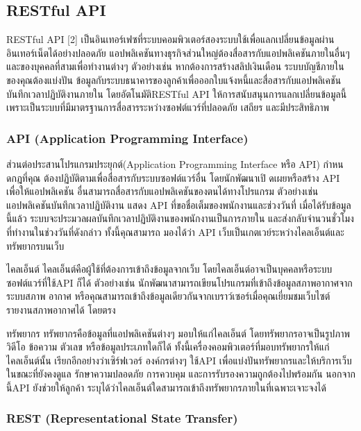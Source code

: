 \subsection{RESTful API}

RESTful API [2] เป็นอินเทอร์เฟซที่ระบบคอมพิวเตอร์สองระบบใช้เพื่อแลกเปลี่ยนข้อมูลผ่านอินเทอร์เน็ตได้อย่างปลอดภัย แอปพลิเคชันทางธุรกิจส่วนใหญ่ต้องสื่อสารกับแอปพลิเคชันภายในอื่นๆ และของบุคคลที่สามเพื่อทํางานต่างๆ ตัวอย่างเช่น หากต้องการสร้างสลิปเงินเดือน ระบบบัญชีภายในของคุณต้องแบ่งปัน
ข้อมูลกับระบบธนาคารของลูกค้าเพื่อออกใบแจ้งหนี้และสื่อสารกับแอปพลิเคชันบันทึกเวลาปฏิบัติงานภายใน
โดยอัตโนมัติRESTful API ให้การสนับสนุนการแลกเปลี่ยนข้อมูลนี้เพราะเป็นระบบที่มีมาตรฐานการสื่อสารระหว่างซอฟต์แวร์ที่ปลอดภัย เสถียร และมีประสิทธิภาพ

\subsubsection{API (Application Programming Interface)}
ส่วนต่อประสานโปรแกรมประยุกต์(Application Programming Interface หรือ API) กําหนดกฎที่คุณ
ต้องปฏิบัติตามเพื่อสื่อสารกับระบบซอฟต์แวร์อื่น โดยนักพัฒนาเปิ ดเผยหรือสร้าง API เพื่อให้แอปพลิเคชัน
อื่นสามารถสื่อสารกับแอปพลิเคชันของตนได้ทางโปรแกรม ตัวอย่างเช่น แอปพลิเคชันบันทึกเวลาปฏิบัติงาน
แสดง API ที่ขอชื่อเต็มของพนักงานและช่วงวันที่ เมื่อได้รับข้อมูลนี้แล้ว ระบบจะประมวลผลบันทึกเวลาปฏิบัติงานของพนักงานเป็นการภายใน
 และส่งกลับจํานวนชั่วโมงที่ทํางานในช่วงวันที่ดังกล่าว ทั้งนี้คุณสามารถ
มองได้ว่า API เว็บเป็นเกตเวย์ระหว่างไคลเอ็นต์และทรัพยากรบนเว็บ

ไคลเอ็นต์ ไคลเอ็นต์คือผู้ใช้ที่ต้องการเข้าถึงข้อมูลจากเว็บ โดยไคลเอ็นต์อาจเป็นบุคคลหรือระบบซอฟต์แวร์ที่ใช้API ก็ได้ 
ตัวอย่างเช่น นักพัฒนาสามารถเขียนโปรแกรมที่เข้าถึงข้อมูลสภาพอากาศจากระบบสภาพ
อากาศ หรือคุณสามารถเข้าถึงข้อมูลเดียวกันจากเบราว์เซอร์เมื่อคุณเยี่ยมชมเว็บไซต์รายงานสภาพอากาศได้
โดยตรง

ทรัพยากร ทรัพยากรคือข้อมูลที่แอปพลิเคชันต่างๆ มอบให้แก่ไคลเอ็นต์ โดยทรัพยากรอาจเป็นรูปภาพ
วิดีโอ ข้อความ ตัวเลข หรือข้อมูลประเภทใดก็ได้ ทั้งนี้เครื่องคอมพิวเตอร์ที่มอบทรัพยากรให้แก่ไคลเอ็นต์นั้น
เรียกอีกอย่างว่าเซิร์ฟเวอร์ องค์กรต่างๆ ใช้API เพื่อแบ่งปันทรัพยากรและให้บริการเว็บในขณะที่ยังคงดูแล
รักษาความปลอดภัย การควบคุม และการรับรองความถูกต้องไปพร้อมกัน นอกจากนี้API ยังช่วยให้ลูกค้า
ระบุได้ว่าไคลเอ็นต์ใดสามารถเข้าถึงทรัพยากรภายในที่เฉพาะเจาะจงได้

\subsubsection{REST (Representational State Transfer)}


